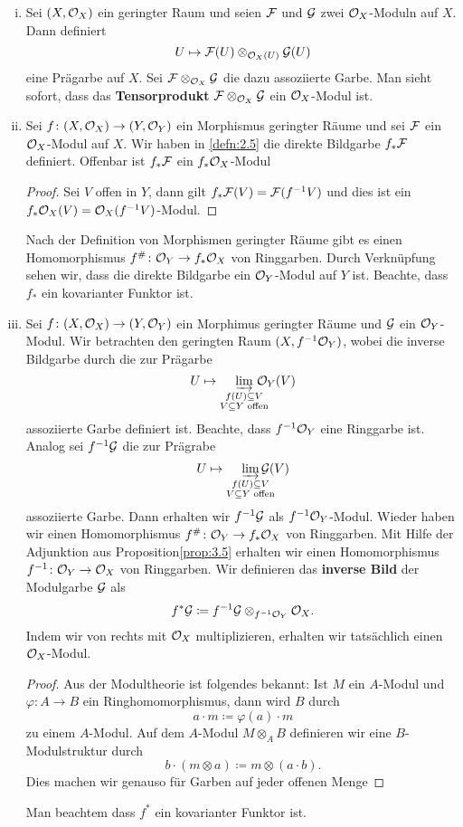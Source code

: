 \begin{kons}
	\begin{enumerate}[i)]
		\item Sei $(X,\mathcal{O}_X)$ ein geringter Raum und seien $\mathcal{F}$ und $\mathcal{G}$ zwei $\mathcal{O}_X$-Moduln auf $X$. Dann definiert
		\[
			U \mapsto \mathcal{F}(U)\otimes_{\mathcal{O}_X(U)}\mathcal{G}(U)
		\]
		eine Prägarbe auf $X$. Sei $\mathcal{F}\otimes_{\mathcal{O}_X} \mathcal{G}$ die dazu assoziierte Garbe. Man sieht sofort, dass das \textbf{Tensorprodukt} $\mathcal{F}\otimes_{\mathcal{O}_X} \mathcal{G}$ ein $\mathcal{O}_X$-Modul ist.
		\item Sei $f\colon(X,\mathcal{O}_X)\to(Y,\mathcal{O}_Y)$ ein Morphismus geringter Räume und sei $\mathcal{F}$ ein $\mathcal{O}_X$-Modul auf $X$. Wir haben in \ref{defn:2.5} die direkte Bildgarbe $f_*\mathcal{F}$ definiert. Offenbar ist $f_*\mathcal{F}$ ein $f_*\mathcal{O}_X$-Modul
		\begin{proof}
			Sei $V$ offen in $Y$, dann gilt $f_*\mathcal{F}(V) = \mathcal{F}(f^{-1}V)$ und dies ist ein $f_*\mathcal{O}_X(V) = \mathcal{O}_X(f^{-1}V)$-Modul.
		\end{proof}
		Nach der Definition von Morphismen geringter Räume gibt es einen Homomorphismus $f^{\#}\colon \mathcal{O}_Y \to f_*\mathcal{O}_X$ von Ringgarben. Durch Verknüpfung sehen wir, dass die direkte Bildgarbe ein $\mathcal{O}_Y$-Modul auf $Y$ ist. Beachte, dass $f_*$ ein kovarianter Funktor ist.
		\item Sei $f\colon (X,\mathcal{O}_X) \to (Y,\mathcal{O}_Y)$ ein Morphimus geringter Räume und $\mathcal{G}$ ein $\mathcal{O}_Y$-Modul. Wir betrachten den geringten Raum $(X, f^{-1}\mathcal{O}_Y)$, wobei die inverse Bildgarbe durch die zur Prägarbe
		\[
			U \mapsto \varinjlim_{\substack{f(U)\subseteq V\\V\subseteq Y \text{ offen}}} \qquad\mathllap{\mco_Y(V)}
		\]
		assoziierte Garbe definiert ist. Beachte, dass $f^{-1}\mathcal{O}_Y$ eine Ringgarbe ist. Analog sei $f^{-1}\mathcal{G}$ die zur Prägrabe
		\[
			U \mapsto \varinjlim_{\substack{f(U)\subseteq V\\V\subseteq Y \text{ offen}}} \quad\mathllap{\mathcal{G}(V)}
		\]
		assoziierte Garbe. Dann erhalten wir $f^{-1}\mathcal{G}$ als $f^{-1}\mathcal{O}_Y$-Modul. Wieder haben wir einen Homomorphismus $f^{\#}\colon \mathcal{O}_Y \to f_*\mathcal{O}_X$ von Ringgarben. Mit Hilfe der Adjunktion aus Proposition\ref{prop:3.5} erhalten wir einen Homomorphismus $f^{-1}\colon \mathcal{O}_Y \to \mathcal{O}_X$ von Ringgarben. Wir definieren das \textbf{inverse Bild} der Modulgarbe $\mathcal{G}$ als
		\[
			f^*\mathcal{G} \coloneqq f^{-1}\mathcal{G} \otimes_{f^{-1}\mathcal{O}_Y}\mathcal{O}_X.
		\]
		Indem wir von rechts mit $\mathcal{O}_X$ multiplizieren, erhalten wir tatsächlich einen $\mathcal{O}_X$-Modul.
		\begin{proof}
			Aus der Modultheorie ist folgendes bekannt: Ist $M$ ein $A$-Modul und $\varphi\colon A \to B$ ein Ringhomomorphismus, dann wird $B$ durch
			\[
				a \cdot m \coloneqq \varphi(a) \cdot m
			\]
			zu einem $A$-Modul. Auf dem $A$-Modul $M\otimes_A B$ definieren wir eine $B$-Modulstruktur durch
			\[
				b\cdot(m\otimes a) \coloneqq m\otimes (a\cdot b).
			\]
			Dies machen wir genauso für Garben auf jeder offenen Menge
		\end{proof}
		Man beachtem dass $f^*$ ein kovarianter Funktor ist.
	\end{enumerate}
\end{kons}


